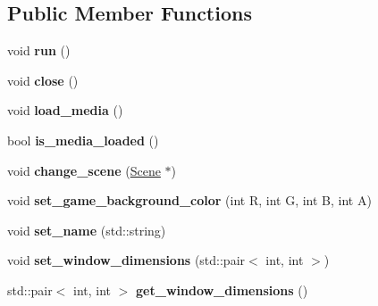\subsection*{Public Member Functions}
\begin{DoxyCompactItemize}
\item 
void {\bfseries run} ()\hypertarget{classengine_1_1_game_a1ab78f5ed0d5ea879157357cf2fb2afa}{}\label{classengine_1_1_game_a1ab78f5ed0d5ea879157357cf2fb2afa}

\item 
void {\bfseries close} ()\hypertarget{classengine_1_1_game_ad5133caa8447aadf71d6ba6c20d552bd}{}\label{classengine_1_1_game_ad5133caa8447aadf71d6ba6c20d552bd}

\item 
void {\bfseries load\+\_\+media} ()\hypertarget{classengine_1_1_game_a9d568f24b1fc461968892659f64a53ca}{}\label{classengine_1_1_game_a9d568f24b1fc461968892659f64a53ca}

\item 
bool {\bfseries is\+\_\+media\+\_\+loaded} ()\hypertarget{classengine_1_1_game_a1c0e0ff94cfbe6f74cfff0633628ae95}{}\label{classengine_1_1_game_a1c0e0ff94cfbe6f74cfff0633628ae95}

\item 
void {\bfseries change\+\_\+scene} (\hyperlink{classengine_1_1_scene}{Scene} $\ast$)\hypertarget{classengine_1_1_game_a241b7b4944e35a4a1fe5435107fbaf65}{}\label{classengine_1_1_game_a241b7b4944e35a4a1fe5435107fbaf65}

\item 
void {\bfseries set\+\_\+game\+\_\+background\+\_\+color} (int R, int G, int B, int A)\hypertarget{classengine_1_1_game_a355c2dcd99a84c813fc89b8d01c3d72b}{}\label{classengine_1_1_game_a355c2dcd99a84c813fc89b8d01c3d72b}

\item 
void {\bfseries set\+\_\+name} (std\+::string)\hypertarget{classengine_1_1_game_a7dd41abdb2a4d0c72f328e1035b2cd06}{}\label{classengine_1_1_game_a7dd41abdb2a4d0c72f328e1035b2cd06}

\item 
void {\bfseries set\+\_\+window\+\_\+dimensions} (std\+::pair$<$ int, int $>$)\hypertarget{classengine_1_1_game_ac3dff191e050d6da33c1846ac5590c09}{}\label{classengine_1_1_game_ac3dff191e050d6da33c1846ac5590c09}

\item 
std\+::pair$<$ int, int $>$ {\bfseries get\+\_\+window\+\_\+dimensions} ()\hypertarget{classengine_1_1_game_a212e95896eb7a9685106e410a2d9b90d}{}\label{classengine_1_1_game_a212e95896eb7a9685106e410a2d9b90d}


\end{DoxyCompactItemize}
